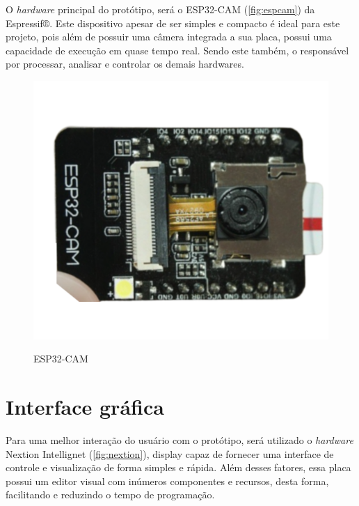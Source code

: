 O \textit{hardware} principal do protótipo, será o ESP32-CAM (\autoref{fig:espcam}) da Espressif®. 
Este dispositivo apesar de ser simples e compacto é ideal para este projeto,  
pois além de possuir uma câmera integrada a sua placa, possui uma capacidade de 
execução em quase tempo real. Sendo este também, o responsável por 
processar, analisar e controlar os demais hardwares. 

\begin{figure}[h!]
    \centering
    \caption{ESP32-CAM}
    \includegraphics[scale=0.25]{figuras/esp32cam.png} 
    \label{fig:espcam}
    \centering
\end{figure}

\section{Interface gráfica}\label{sec:materiais}

Para uma melhor interação do usuário com o protótipo, será utilizado o \textit{hardware} 
Nextion Intellignet (\autoref{fig:nextion}), display capaz de fornecer uma interface de controle e visualização 
de forma simples e rápida. Além desses fatores, essa placa possui um editor visual 
com inúmeros componentes e recursos, desta forma, facilitando e reduzindo o tempo 
de programação.

